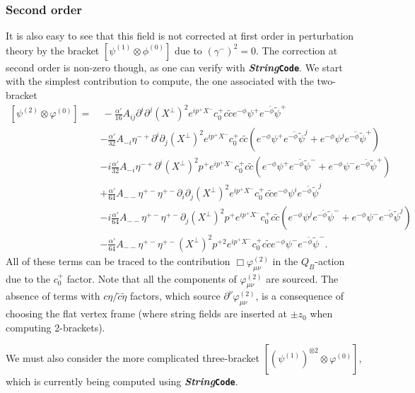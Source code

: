 \documentclass[12pt]{article}
\numberwithin{equation}{section}
\newcommand{\WT}[1]{\widetilde{#1}}
\newcommand{\StringCode}{\textbf{\textit{String}}{\color{scpurple}\textbf{\texttt{Code}}}}
\begin{document}
\subsubsection{Second order}
It is also easy to see that this field is not corrected at first order in perturbation theory by the bracket $\left[\psi^{(1)}\otimes \phi^{(0)}\right]$ due to $(\gamma^-)^2=0$. The correction at second order is non-zero though, as one can verify with \StringCode. We start with the simplest contribution to compute, the one associated with the two-bracket
\begin{equation}
\begin{split}
    \left[\psi^{(2)}\otimes\varphi^{(0)}\right] =&\ -\frac{\alpha'}{16}A_{ij}\partial^i\partial^j (X^{\perp})^2 e^{ip^+X^-}c_0^+ c\WT{c}e^{-\phi}\psi^+e^{-\WT{\phi}}\WT{\psi}^+\\
    &-\frac{\alpha'}{32}A_{-i}\eta^{-+}\partial^i\partial_{j}(X^{\perp})^2e^{ip^+X^-}c_0^+c\WT{c}\left(e^{-\phi}\psi^+e^{-\WT{\phi}}\WT{\psi}^j+e^{-\phi}\psi^je^{-\WT{\phi}}\WT{\psi}^+\right)\\
    &-i\frac{\alpha'}{32}A_{-i}\eta^{-+}\partial^i(X^{\perp})^2p^+e^{ip^+X^-}c_0^+c\WT{c}\left(e^{-\phi}\psi^+e^{-\WT{\phi}}\WT{\psi}^-+e^{-\phi}\psi^-e^{-\WT{\phi}}\WT{\psi}^+\right)\\
    &+\frac{\alpha'}{64}A_{--}\eta^{+-}\eta^{+-}\partial_{i}\partial_j(X^{\perp})^2e^{ip^+X^-}c_0^+c\WT{c}e^{-\phi}\psi^ie^{-\WT{\phi}}\WT{\psi}^j\\
    &-i\frac{\alpha'}{64}A_{--}\eta^{+-}\eta^{+-}\partial_j(X^{\perp})^2p^+e^{ip^+X^-}c_0^+c\WT{c}\left(e^{-\phi}\psi^je^{-\WT{\phi}}\WT{\psi}^-+e^{-\phi}\psi^-e^{-\WT{\phi}}\WT{\psi}^j\right)\\
    &-\frac{\alpha'}{64}A_{--}\eta^{+-}\eta^{+-}(X^{\perp})^2p^{+2}e^{ip^+X^-}c_0^+c\WT{c}e^{-\phi}\psi^-e^{-\WT{\phi}}\WT{\psi}^-.
\end{split}
\end{equation}
All of these terms can be traced to the contribution $\Box \varphi_{\mu\nu}^{(2)}$ in the $Q_B$-action due to the $c_0^+$ factor. Note that all the components of $\varphi_{\mu\nu}^{(2)}$ are sourced. The absence of terms with $c\eta/\WT{c}\WT{\eta}$ factors, which source $\partial^{\nu}\varphi_{\mu\nu}^{(2)}$, is a consequence of choosing the flat vertex frame (where string fields are inserted at $\pm z_0$ when computing 2-brackets).

We must also consider the more complicated three-bracket $\left[(\psi^{(1)})^{\otimes 2}\otimes \varphi^{(0)}\right]$, which is currently being computed using \StringCode.
\end{document}
